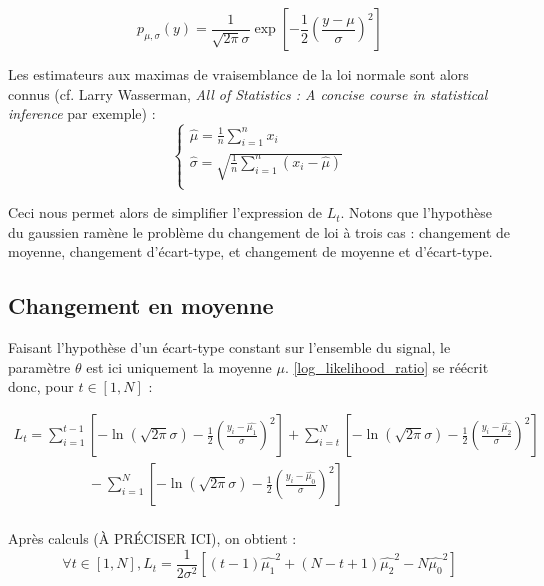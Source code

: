 \documentclass[french,12pt,notitlepage]{report}
\begin{document}
	\begin{equation*}
		p_{\mu, \sigma}(y) = \frac1{\sqrt{2 \pi} \sigma} \exp \left[ -\frac12 \left( \frac{y - \mu}{\sigma} \right)^2 \right]
	\end{equation*}
	
	Les estimateurs aux maximas de vraisemblance de la loi normale sont alors connus (cf. Larry Wasserman, \textit{All of Statistics : A concise course in statistical inference} par exemple) :
	\begin{equation}
	\left\{
	\begin{array}{ll}
		\hat{\mu} = \frac{1}{n} \sum_{i=1}^n x_i \\
		\hat{\sigma} = \sqrt{\frac{1}{n} \sum_{i=1}^n (x_i - \hat{\mu})} \\
	\end{array}
	\right.
	\label{estimators}
	\end{equation}
	
	Ceci nous permet alors de simplifier l'expression de $L_t$. Notons que l'hypothèse du gaussien ramène le problème du changement de loi à trois cas : changement de moyenne, changement d'écart-type, et changement de moyenne et d'écart-type.
	
	\subsection{Changement en moyenne}
	Faisant l'hypothèse d'un écart-type constant sur l'ensemble du signal, le paramètre $\theta$ est ici uniquement la moyenne $\mu$. \ref{log_likelihood_ratio} se réécrit donc, pour $t \in [1,N]$ :
	
	\begin{equation*}
	\begin{array}{ll}
		L_t = \sum_{i=1}^{t-1} \left[-\ln (\sqrt{2 \pi} \sigma)-\frac{1}{2}\left( \frac{y_i-\hat{\mu_1}}{\sigma} \right) ^2 \right] + \sum_{i=t}^{N} \left[-\ln (\sqrt{2 \pi} \sigma)-\frac{1}{2}\left( \frac{y_i-\hat{\mu_2}}{\sigma} \right) ^2 \right] \\
		~~~~~~~~~~~~~~~~~~~~~~~~ - \sum_{i=1}^{N} \left[-\ln (\sqrt{2 \pi} \sigma)-\frac{1}{2}\left( \frac{y_i-\hat{\mu_0}}{\sigma} \right) ^2 \right] \\
	\end{array}
	\end{equation*}
	
	Après calculs (À PRÉCISER ICI), on obtient :
	\begin{equation}
		\forall t \in [1, N], L_t = \frac{1}{2 \sigma ^2}\left[(t-1)\hat{\mu_1}^2 + (N - t + 1)\hat{\mu_2}^2 - N\hat{\mu_0}^2 \right]
		\label{meanchange}
	\end{equation}
	
\end{document}

